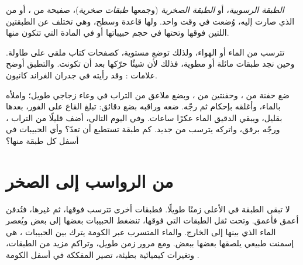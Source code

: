 \begin{definition}\label{def:g7:sediments-and-fossils:layer}
\emph{الطبقة الرسوبية}، أو \emph{الطبقة
الصخرية} (وجمعها \emph{طبقات صخرية})، صفيحة من ،
أو من  الذي صارت إليه، وُضعت في وقت واحد. ولها قاعدة وسطح، وهي
تختلف عن الطبقتين اللتين فوقها وتحتها في حجم حبيباتها أو في المادة
التي تتكون منها.
\end{definition}

تترسب  من الماء أو الهواء، ولذلك توضع مستوية، كصفحات كتاب ملقى
على طاولة. وحين نجد طبقات مائلة أو مطوية، فذلك لأن شيئًا حرّكها بعد أن
تكونت. والتطبق أوضح علامات : وقد رأيته في جدران الغراند
كانيون.

\begin{inthelab}
ضع حفنة من ، وحفنتين من ، وبضع ملاعق من التراب في وعاء زجاجي
طويل؛ واملأه بالماء، وأغلقه بإحكام ثم رجّه. ضعه وراقبه بضع دقائق: تبلغ
 القاع على الفور،  بعدها بقليل، ويبقي  الدقيق الماء
عكرًا ساعات. وفي اليوم التالي، أضف قليلًا من التراب ، ورجّه برفق،
واتركه يترسب من جديد. كم طبقة تستطيع أن تعدّ؟ وأي الحبيبات في أسفل كل
طبقة منها؟
\end{inthelab}

\section{من الرواسب إلى الصخر}

لا تبقى الطبقة في الأعلى زمنًا طويلًا. فطبقات أخرى تترسب فوقها، ثم
غيرها، فتُدفن أعمق فأعمق. وتحت ثقل الطبقات التي فوقها، تنضغط الحبيبات
بعضها إلى بعض ويُعصر الماء الذي بينها إلى الخارج. والماء المتسرب عبر
الكومة يترك بين الحبيبات ، هي إسمنت طبيعي يلصقها بعضها ببعض. ومع
مرور زمن طويل، وتراكم مزيد من الطبقات، وتغيرات كيميائية بطيئة، تصير
 المفككة في أسفل الكومة .


